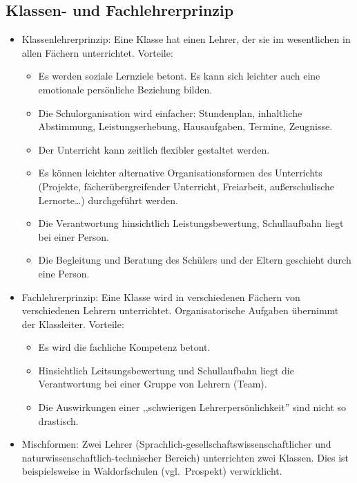 \subsection{Klassen- und Fachlehrerprinzip}
\begin{itemize}
\item Klassenlehrerprinzip: Eine Klasse hat einen Lehrer, der
sie im wesentlichen in allen F\"{a}chern unterrichtet.
Vorteile:
\begin{itemize}
\item Es werden soziale Lernziele betont.
Es kann sich leichter auch eine emotionale pers\"{o}nliche
Beziehung bilden.
\item Die Schulorganisation wird einfacher: Stundenplan, inhaltliche
Abstimmung, Leistungserhebung, Hausaufgaben, Termine, Zeugnisse.
\item Der Unterricht kann zeitlich flexibler gestaltet werden.
\item Es k\"{o}nnen leichter alternative Organisationsformen des
Unterrichts (Projekte, f\"{a}\-cher\-\"{u}ber\-grei\-fen\-der Unterricht,
Freiarbeit, au{\ss}erschulische Lernorte\dots) durchgef\"{u}hrt werden.
\item Die Verantwortung hinsichtlich Leistungsbewertung,
Schullaufbahn liegt bei einer Person.
\item Die Begleitung und Beratung des Sch\"{u}lers und der
Eltern geschieht durch eine Person.
\end{itemize}

\item Fachlehrerprinzip:
Eine Klasse wird in verschiedenen F\"{a}chern von
verschiedenen Lehrern unterrichtet.
Organisatorische Aufgaben \"{u}bernimmt der Klassleiter.
Vorteile:
\begin{itemize}
\item Es wird die fachliche Kompetenz betont.
\item Hinsichtlich Leitsungsbewertung und Schullaufbahn liegt die
Verantwortung bei einer Gruppe von Lehrern (Team).
\item Die Auswirkungen einer
,,schwierigen Lehrerpers\"{o}nlichkeit'' sind nicht so drastisch.
\end{itemize}
\item Mischformen: Zwei Lehrer
(Sprachlich-gesellschaftswissenschaftlicher
und natur\-wis\-sen\-schaft\-lich-technischer Bereich)
unterrichten zwei Klassen.
Dies ist beispielsweise in Waldorfschulen (vgl.\ Prospekt)
verwirklicht.
\end{itemize}


